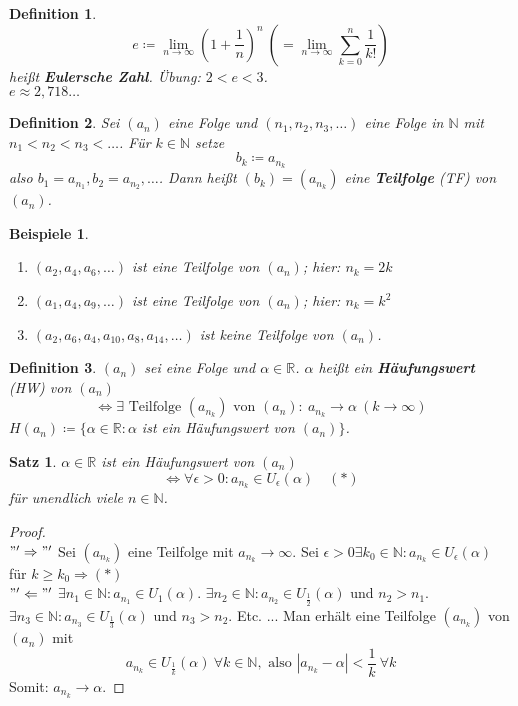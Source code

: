 \documentclass[14pt,titlepage,ngerman,a4paper,headsepline,DIV15,halfparskip*]{scrartcl}
\newcommand{\N}{\mathbb{N}}
\newcommand{\R}{\mathbb{R}}
\theoremstyle{named}
\theoremstyle{dotless}
\newtheorem{satz}[namedtheorem]{Satz}
\newtheorem*{beispiele}{Beispiele}
\newtheorem*{definition}{Definition}
\begin{document}
\begin{definition} 
	$$
		e \coloneqq \lim_{n \rightarrow \infty} \left( 1 + \frac{1}{n} \right)^{n} ~( = \lim_{n \rightarrow \infty} \sum_{k = 0}^{n} \frac{1}{k!} )
	$$
	hei{\ss}t \textbf{Eulersche Zahl}. Übung: $2 < e < 3$. \\
	$e \approx 2,718\dotsc$
\end{definition}

\begin{definition} 
	Sei $(a_{n})$ eine Folge und $(n_{1}, n_{2}, n_{3}, \dotsc)$ eine Folge in $\N$ mit \\
	$n_{1} < n_{2} < n_{3} < \dotsc$. Für $k \in \N$ setze
	$$
		b_{k} \coloneqq a_{n_{k}}
	$$
	also $b_{1} = a_{n_{1}}, b_{2} = a_{n_{2}}, \dotsc$. Dann hei{\ss}t $(b_{k}) = (a_{n_{k}})$ eine \textbf{Teilfolge} (TF) von $(a_{n})$.
\end{definition}


\begin{beispiele}\
	\begin{enumerate}
		\item $(a_{2}, a_{4}, a_{6}, \dotsc)$ ist eine Teilfolge von $(a_{n})$; hier: $n_{k} = 2k$
		\item $(a_{1}, a_{4}, a_{9}, \dotsc)$ ist eine Teilfolge von $(a_{n})$; hier: $n_{k} = k^2$
		\item $(a_{2}, a_{6}, a_{4}, a_{10}, a_{8}, a_{14}, \dotsc)$ ist keine Teilfolge von $(a_{n})$.
	\end{enumerate}
\end{beispiele}


\begin{definition}
	$(a_{n})$ sei eine Folge und $\alpha \in \R$. $\alpha$ hei{\ss}t ein \textbf{Häufungswert} (HW) von $(a_{n})$
	$$
		\iff \exists \text{ Teilfolge } (a_{n_{k}}) \text{ von } (a_{n}) : ~a_{n_{k}} \rightarrow \alpha ~(k \rightarrow \infty) 
	$$	
	$H(a_{n}) \coloneqq \{ \alpha \in \R: \alpha$ ist ein Häufungswert von $(a_{n}) \}$.
\end{definition}


\begin{satz} \label{2.10:satz}
	$\alpha \in \R$ ist ein Häufungswert von $(a_{n})$
	$$
		\iff \forall \epsilon > 0: a_{n_{k}} \in U_{\epsilon}(\alpha) \quad (*)
	$$
	für unendlich viele $n \in \N$.
\end{satz}

\begin{proof} ~\\
	$"'\Rightarrow"'$ Sei $(a_{n_{k}})$ eine Teilfolge mit $a_{n_{k}} \rightarrow \infty$. Sei $\epsilon > 0 \exists k_{0} \in \N: a_{n_{k}} \in U_{\epsilon}(\alpha)$ für $k \geq k_{0} \Rightarrow (*)$ \\
	$"'\Leftarrow"'$ $\exists n_{1} \in \N: a_{n_{1}} \in U_{1}(\alpha)$. $\exists n_{2} \in \N: a_{n_{2}} \in U_{\frac{1}{2}}(\alpha)$ und $n_{2} > n_{1}$. $\exists n_{3} \in \N: a_{n_{3}} \in U_{\frac{1}{3}}(\alpha)$ und $n_{3} > n_{2}$. Etc. ... Man erhält eine Teilfolge $(a_{n_{k}})$ von $(a_{n})$ mit
	$$
		a_{n_{k}} \in U_{\frac{1}{k}}(\alpha) ~\forall k \in \N, \text{ also } |a_{n_{k}} - \alpha| < \frac{1}{k} ~\forall k
	$$
	Somit: $a_{n_{k}} \rightarrow \alpha$. 
\end{proof}
\end{document}
